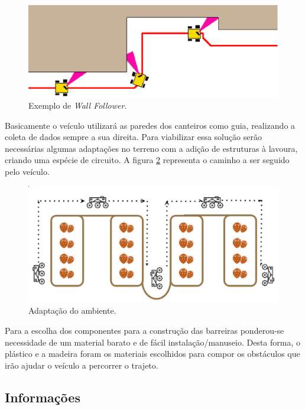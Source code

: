     \begin{figure}[!htbp]
    \begin{center}
    \includegraphics[width=.7\textwidth]{figuras/wallfollower.eps}
    \caption{\label{fig:wallfollower}Exemplo de \textit{Wall Follower}.}
    \end{center}
    \end{figure}

    \vfill
    \pagebreak

    Basicamente o veículo utilizará as paredes dos canteiros como guia, realizando a
    coleta de dados sempre a sua direita. Para viabilizar essa solução serão necessárias algumas adaptações no terreno com a adição de estruturas à lavoura, criando uma espécie de circuito. A figura \ref{fig:ambientadapt} representa o caminho a ser seguido pelo veículo.

    \begin{figure}[!htbp]
    \begin{center}
    \includegraphics[width=.7\textwidth]{figuras/adapt.eps}
    \caption{\label{fig:ambientadapt}Adaptação do ambiente.}
    \end{center}
    \end{figure}

    \vfill
    \pagebreak

    Para a escolha dos componentes para a construção das barreiras ponderou-se
    necessidade de um material barato e de fácil instalação/manuseio.
    Desta forma, o plástico e a madeira foram os materiais escolhidos para compor os obstáculos
    que irão ajudar o veículo a percorrer o trajeto.

  \subsection{Informações}

